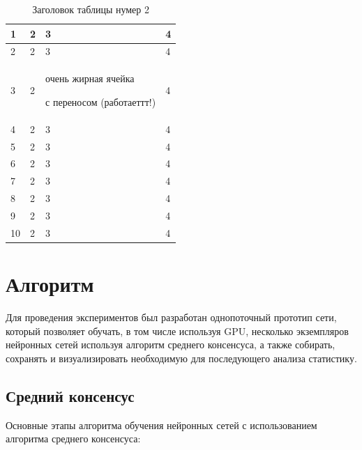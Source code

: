 \documentclass[a4paper,article,14pt]{extarticle}
\begin{document}
\begin{center}
    \begin{longtable}{|p{2cm}||p{3cm}|p{7cm}|p{3cm}|}
    \caption{Заголовок таблицы нумер 2}\\
    \hline
    1 & 2 & 3 & 4\\
    \hline
    2 & 2 & 3 & 4\\
    \hline
    3 & 2 & очень жирная ячейка \par с переносом (работаеттт!) & 4\\
    \hline
    4 & 2 & 3 & 4\\
    \hline
    5 & 2 & 3 & 4\\
    \hline
    6 & 2 & 3 & 4\\
    \hline
    7 & 2 & 3 & 4\\
    \hline
    8 & 2 & 3 & 4\\
    \hline
    9 & 2 & 3 & 4\\
    \hline
    10 & 2 & 3 & 4\\
    \hline


    \end{longtable}
\end{center}

\pagebreak

\section{Алгоритм}
Для проведения экспериментов был разработан однопоточный прототип сети, который позволяет обучать, в том числе используя GPU, несколько экземпляров нейронных сетей используя алгоритм среднего консенсуса, а также собирать, сохранять и визуализировать необходимую для последующего анализа статистику.
\subsection{Средний консенсус}
Основные этапы алгоритма обучения нейронных сетей с использованием алгоритма среднего консенсуса:
\end{document}
